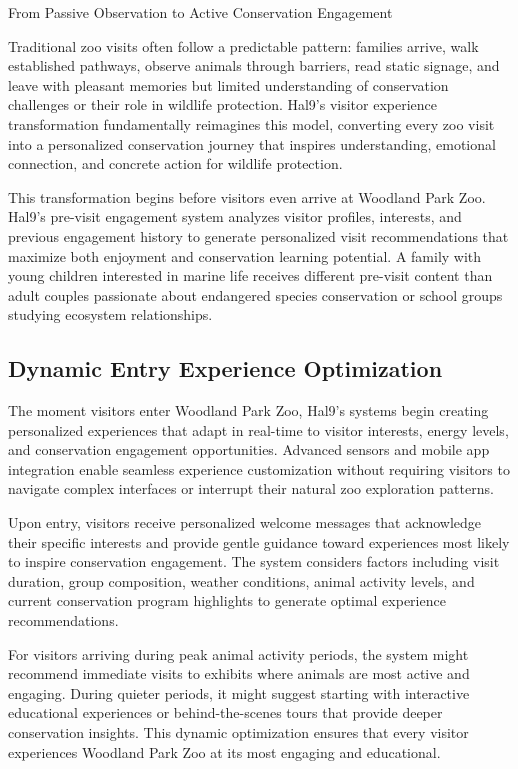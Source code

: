 \documentclass[
  Letterpaper,
]{scrbook}
\begin{document}
From Passive Observation to Active Conservation Engagement

\hfill\break

Traditional zoo visits often follow a predictable pattern: families
arrive, walk established pathways, observe animals through barriers,
read static signage, and leave with pleasant memories but limited
understanding of conservation challenges or their role in wildlife
protection. Hal9's visitor experience transformation fundamentally
reimagines this model, converting every zoo visit into a personalized
conservation journey that inspires understanding, emotional connection,
and concrete action for wildlife protection.

This transformation begins before visitors even arrive at Woodland Park
Zoo. Hal9's pre-visit engagement system analyzes visitor profiles,
interests, and previous engagement history to generate personalized
visit recommendations that maximize both enjoyment and conservation
learning potential. A family with young children interested in marine
life receives different pre-visit content than adult couples passionate
about endangered species conservation or school groups studying
ecosystem relationships.

\subsection{Dynamic Entry Experience
Optimization}\label{dynamic-entry-experience-optimization}

The moment visitors enter Woodland Park Zoo, Hal9's systems begin
creating personalized experiences that adapt in real-time to visitor
interests, energy levels, and conservation engagement opportunities.
Advanced sensors and mobile app integration enable seamless experience
customization without requiring visitors to navigate complex interfaces
or interrupt their natural zoo exploration patterns.

Upon entry, visitors receive personalized welcome messages that
acknowledge their specific interests and provide gentle guidance toward
experiences most likely to inspire conservation engagement. The system
considers factors including visit duration, group composition, weather
conditions, animal activity levels, and current conservation program
highlights to generate optimal experience recommendations.

For visitors arriving during peak animal activity periods, the system
might recommend immediate visits to exhibits where animals are most
active and engaging. During quieter periods, it might suggest starting
with interactive educational experiences or behind-the-scenes tours that
provide deeper conservation insights. This dynamic optimization ensures
that every visitor experiences Woodland Park Zoo at its most engaging
and educational.
\end{document}
